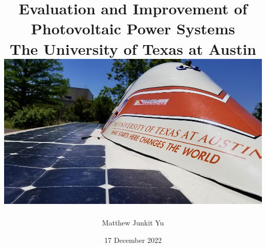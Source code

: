 \documentclass[12pt]{report}
\begin{document}
\title {
    {Evaluation and Improvement of Photovoltaic Power Systems}\\
    {\large The University of Texas at Austin}\\
    {\includegraphics[width=\textwidth]{lonestar_cover.jpg}}
}
\author{Matthew Junkit Yu}
\date{17 December 2022}
\maketitle

{
    \hypersetup{linkcolor=black}
    \tableofcontents
    \listoffigures
    \listoftables
}






{
    \hypersetup{linkcolor=black}
    \printbibliography
    \begin{appendices}
        
        
    \end{appendices}
    \listoftodos[TODOS]
}
\end{document}
